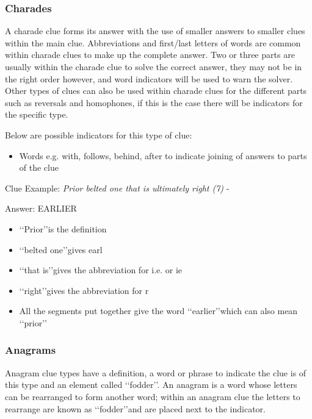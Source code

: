 \subsubsection{Charades}

A charade clue forms its answer with the use of smaller answers to smaller clues within the main clue. Abbreviations and first/last letters of words are common within charade clues to make up the complete answer. Two or three parts are usually within the charade clue to solve the correct answer, they may not be in the right order however, and word indicators will be used to warn the solver. Other types of clues can also be used within charade clues for the different parts such as reversals and homophones, if this is the case there will be indicators for the specific type.  

Below are possible indicators for this type of clue: 
\begin{itemize}
	\item Words e.g. with, follows, behind, after to indicate joining of answers to parts of the clue 
\\
\end{itemize}

Clue Example: \emph{Prior belted one that is ultimately right (7)} - \citep{shuchiCharades08}

Answer: EARLIER 

\begin{itemize}
	\item \lq\lq Prior\rq\rq is the definition 
	\item \lq\lq belted one\rq\rq gives earl 
	\item \lq\lq that is\rq\rq gives the abbreviation for i.e. or ie 
	\item \lq\lq right\rq\rq gives the abbreviation for r 
	\item All the segments put together give the word \lq\lq earlier\rq\rq which can also mean \lq\lq prior\rq\rq
\end{itemize}

\subsubsection{Anagrams}

Anagram clue types have a definition, a word or phrase to indicate the clue is of this type and an element called \lq\lq fodder\rq\rq. An anagram is a word whose letters can be rearranged to form another word; within an anagram clue the letters to rearrange are known as \lq\lq fodder\rq\rq and are placed next to the indicator.  

